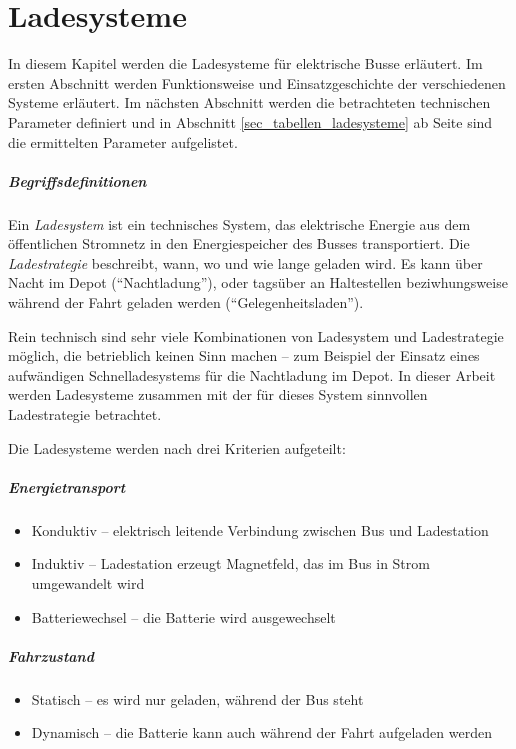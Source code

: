 \chapter{Ladesysteme}
In diesem Kapitel werden die Ladesysteme für elektrische Busse erläutert. Im ersten Abschnitt werden Funktionsweise und Einsatzgeschichte der verschiedenen Systeme erläutert. Im nächsten Abschnitt werden die betrachteten technischen Parameter definiert und in Abschnitt \ref{sec_tabellen_ladesysteme} ab Seite \pageref{sec_tabellen_ladesysteme} sind die ermittelten Parameter aufgelistet.

\paragraph{Begriffsdefinitionen}
Ein \emph{Ladesystem} ist ein technisches System, das elektrische Energie aus dem öffentlichen Stromnetz in den Energiespeicher des Busses transportiert. Die \emph{Ladestrategie} beschreibt, wann, wo und wie lange geladen wird. Es kann über Nacht im Depot ("`Nachtladung"'), oder tagsüber an Haltestellen beziwhungsweise während der Fahrt geladen werden ("`Gelegenheitsladen"'). 

Rein technisch sind sehr viele Kombinationen von Ladesystem und Ladestrategie möglich, die betrieblich keinen Sinn machen – zum Beispiel der Einsatz eines aufwändigen Schnelladesystems für die Nachtladung im Depot. In dieser Arbeit werden Ladesysteme zusammen mit der für dieses System sinnvollen Ladestrategie betrachtet.

Die Ladesysteme werden nach drei Kriterien aufgeteilt:

\paragraph{Energietransport}
\begin{itemize}
	\item Konduktiv – elektrisch leitende Verbindung zwischen Bus und Ladestation
	\item Induktiv – Ladestation erzeugt Magnetfeld, das im Bus in Strom umgewandelt wird
	\item Batteriewechsel – die Batterie wird ausgewechselt
\end{itemize}

\paragraph{Fahrzustand}
\begin{itemize}
	\item Statisch – es wird nur geladen, während der Bus steht
	\item Dynamisch – die Batterie kann auch während der Fahrt aufgeladen werden
\end{itemize}

